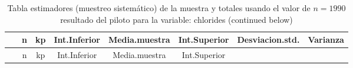 \documentclass[
]{article}
\begin{document}
\begin{longtable}[]{@{}cccccccc@{}}
\caption{Tabla estimadores (muestreo sistemático) de la muestra y
totales usando el valor de \(n = 1990\) resultado del piloto para la
variable: chlorides (continued below)}\tabularnewline
\toprule
\begin{minipage}[b]{0.18\columnwidth}\centering
~\strut
\end{minipage} & \begin{minipage}[b]{0.05\columnwidth}\centering
n\strut
\end{minipage} & \begin{minipage}[b]{0.03\columnwidth}\centering
kp\strut
\end{minipage} & \begin{minipage}[b]{0.10\columnwidth}\centering
Int.Inferior\strut
\end{minipage} & \begin{minipage}[b]{0.11\columnwidth}\centering
Media.muestra\strut
\end{minipage} & \begin{minipage}[b]{0.10\columnwidth}\centering
Int.Superior\strut
\end{minipage} & \begin{minipage}[b]{0.12\columnwidth}\centering
Desviacion.std.\strut
\end{minipage} & \begin{minipage}[b]{0.08\columnwidth}\centering
Varianza\strut
\end{minipage}\tabularnewline
\midrule
\endfirsthead
\toprule
\begin{minipage}[b]{0.18\columnwidth}\centering
~\strut
\end{minipage} & \begin{minipage}[b]{0.05\columnwidth}\centering
n\strut
\end{minipage} & \begin{minipage}[b]{0.03\columnwidth}\centering
kp\strut
\end{minipage} & \begin{minipage}[b]{0.10\columnwidth}\centering
Int.Inferior\strut
\end{minipage} & \begin{minipage}[b]{0.11\columnwidth}\centering
Media.muestra\strut
\end{minipage} & \begin{minipage}[b]{0.10\columnwidth}\centering
Int.Superior\strut
\end{minipage} & \begin{minipage}[b]{0.12\columnwidth}\centering

\end{minipage}
\end{longtable}
\end{document}
